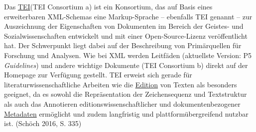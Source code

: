 \documentclass{article}
\begin{document}
        Das \href{http://gams.uni-graz.at/o:konde.178}{TEI}(TEI Consortium a) ist ein Konsortium, das auf Basis eines
                  erweiterbaren XML-Schemas eine Markup-Sprache – ebenfalls TEI genannt – zur
                  Auszeichnung der Eigenschaften von Dokumenten im Bereich der Geistes- und
                  Sozialwissenschaften entwickelt und mit einer Open-Source-Lizenz veröffentlicht
                  hat. Der Schwerpunkt liegt dabei auf der Beschreibung von Primärquellen für
                  Forschung und Analysen. Wie bei XML werden Leitfäden (aktuellste Version: P5 \emph{Guidelines}) und andere wichtige Dokumente (TEI
                     Consortium b) direkt auf der Homepage zur Verfügung gestellt. TEI
                  erweist sich gerade für literaturwissenschaftliche Arbeiten wie die \href{http://gams.uni-graz.at/o:konde.59}{Edition} von Texten als besonders
                  geeignet, da es sowohl die Repräsentation der Zeichensequenz und Textstruktur als
                  auch das Annotieren editionswissenschaftlicher und dokumentenbezogener \href{http://gams.uni-graz.at/o:konde.25}{Metadaten} ermöglicht und zudem
                  langfristig und plattformübergreifend nutzbar ist. (Schöch 2016, S.
                     335)\\
            
\end{document}
